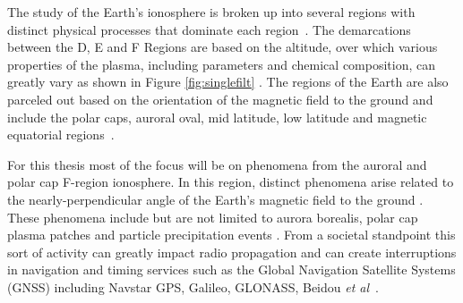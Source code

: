 
%
% 
%

The study of the Earth's ionosphere is broken up into several regions with distinct physical processes that dominate each region~\cite{kellybook}. The demarcations between the D, E and F Regions are based on the altitude, over which various properties of the plasma, including parameters and chemical composition, can greatly vary as shown in Figure \ref{fig:singlefilt} \cite{kellybook}. The regions of the Earth are also parceled out based on the orientation of the magnetic field to the ground and include the polar caps, auroral oval, mid latitude, low latitude and magnetic equatorial regions~\cite{schunk2004ionospheres}.

For this thesis most of the focus will be on phenomena from the auroral and polar cap F-region ionosphere. In this region, distinct phenomena arise related to the nearly-perpendicular angle of the Earth's magnetic field to the ground \cite{schunk2004ionospheres}. These phenomena include but are not limited to aurora borealis, polar cap plasma patches and particle precipitation events \cite{Perry:2015jf,Dahlgren:2013ip,dahlgren2012di,Dahlgren:2012dq,semeter:plasmatransport2012}. From a societal standpoint this sort of activity can greatly impact radio propagation and can create interruptions in navigation and timing services such as the Global Navigation Satellite Systems (GNSS) including Navstar GPS, Galileo, GLONASS, Beidou \textit{et al}~\cite{Jiao:2013ei,hunsucker2007high}.


